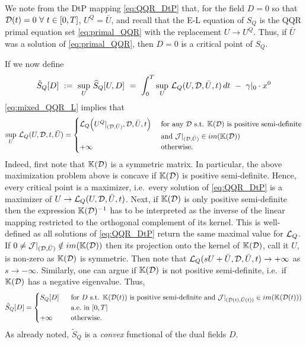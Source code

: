 \documentclass[11pt]{article}
\begin{document}
We note from the DtP mapping \eqref{eq:QQR_DtP} that, for the field $D = 0$ so that $\mathcal{D}(t) = 0 \ \forall \ t \in [0,T]$, $U^Q = \bar{U}$, and recall that the E-L equation of $S_Q$ is the QQR primal equation set \eqref{eq:primal_QQR} with the replacement $U \to U^Q$. Thus, if $\bar{U}$ was a solution of \eqref{eq:primal_QQR}, then $D=0$ is a critical point of $S_Q$.

If we now define
\begin{equation} \label{eq: def tildeS}
\tilde{S}_Q[D] \ := \ \sup_{U} \, \widehat{S}_Q [U,D] \ = \ \int_0^T \sup_{U} \, \mathcal{L}_Q (U, \mathcal{D}, \bar{U}, t) \, dt \ - \ \gamma|_0 \cdot x^0
\end{equation}
\eqref{eq:mixed_QQR_L} implies that
\begin{equation*}
\sup_{U} \, \mathcal{L}_Q (U, \mathcal{D}, t, \bar{U}) = \begin{cases} \mathcal{L}_Q \Big(U^Q|_{(\mathcal{D},\bar{U})},\mathcal{D}, \bar{U}, t \Big) &\mbox{ for any } \mathcal{D}  \text{ s.t. }  \mathbb{K}(\mathcal{D})  \text{ is positive semi-definite} \\ &\text{ and } \mathcal{J}|_{(\mathcal{D},\bar{U})} \in im(\mathbb{K}(\mathcal{D}))\\
+ \infty  &\text{ otherwise}.
\end{cases}
\end{equation*}
Indeed, first note that $\mathbb{K}(\mathcal{D})$ is a symmetric matrix. In particular, the above maximization problem above is concave if $\mathbb{K}(\mathcal{D})$ is positive semi-definite. Hence, every critical point is a maximizer, i.e.~every solution of \eqref{eq:QQR_DtP} is a maximizer of $U \to \mathcal{L}_Q(U,\mathcal{D},\bar{U},t)$. Next, if $\mathbb{K}(\mathcal{D})$ is only positive semi-definite then the expression $\mathbb{K}(\mathcal{D})^{-1}$ has to be interpreted as the inverse of the linear mapping restricted to the orthogonal complement of its kernel. This is well-defined as all solutions of \eqref{eq:QQR_DtP} return the same maximal value for $\mathcal{L}_Q$. If $0\neq \mathcal{J}|_{(\mathcal{D},\bar{U})} \notin im(\mathbb{K}(\mathcal{D}))$ then its projection onto the kernel of $\mathbb{K}(\mathcal{D})$, call it $U$, is non-zero as $\mathbb{K}(\mathcal{D})$ is symmetric. Then note that $\mathcal{L}_Q(sU + \bar{U},\mathcal{D},\bar{U},t) \rightarrow +\infty$ as $s \to -\infty$. Similarly, one can argue if $\mathbb{K}(\mathcal{D})$ is not positive semi-definite, i.e.~if $\mathbb{K}(\mathcal{D})$ has a negative eigenvalue. Thus,
\begin{equation}\label{eq: tildeSQ}
\tilde{S}_Q [D] = \begin{cases} S_Q [D] \ &\mbox{ for } D \mbox{ s.t. } \mathbb{K}(\mathcal{D}(t)) \mbox{ is positive semi-definite and $\mathcal{J}|_{(\mathcal{D}(t),\bar{U}(t))} \in im(\mathbb{K}(\mathcal{D}(t)))$} \\ &\text{ a.e.~in } [0,T] \\
+ \infty &\mbox{ otherwise}.
\end{cases}
\end{equation}
As already noted, $\tilde{S}_Q$ is a \emph{convex} functional of the dual fields $D$.
\end{document}

